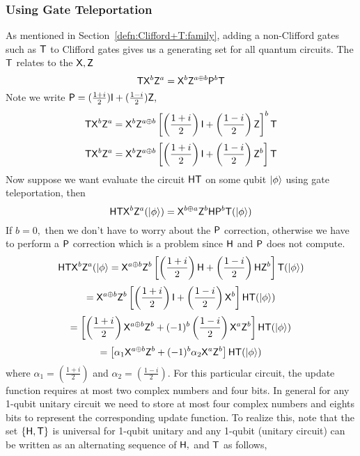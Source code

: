 \subsubsection{Using Gate Teleportation}
As mentioned in  Section~\ref{defn:Clifford+T:family}, adding a non-Clifford gates  such as ${\sf T}$ to Clifford gates gives us a generating set for all quantum circuits. The ${\sf T}$ relates to the ${\sf X}, {\sf Z}$
$${\sf T} {\sf X}^b {\sf Z}^a={\sf X}^b {\sf Z}^{a\oplus b}{\sf P}^b {\sf T}$$
Note we write ${\sf P}=(\frac{1+i}{2}) {\sf I} + (\frac{1-i}{2}){\sf Z},$
$${\sf T} {\sf X}^b {\sf Z}^a={\sf X}^b {\sf Z}^{a\oplus b}\left[\left(\frac{1+i}{2}\right) {\sf I} + \left(\frac{1-i}{2}\right){\sf Z}\right]^b {\sf T}$$
$${\sf T} {\sf X}^b {\sf Z}^a={\sf X}^b {\sf Z}^{a\oplus b}\left[\left(\frac{1+i}{2}\right) {\sf I} + \left(\frac{1-i}{2}\right){\sf Z}^b\right] {\sf T}$$
Now suppose we  want evaluate the circuit ${\sf H} {\sf T}$ on some qubit ${\lvert}\phi\rangle$ using gate teleportation, then
 $${\sf H} {\sf T} {\sf X}^b {\sf Z}^a ({\lvert}\phi\rangle) = {\sf X}^{b\oplus a} {\sf Z}^b {\sf H} {\sf P}^b {\sf T}({\lvert}\phi\rangle)$$
 If $b=0,$ then we don't have to worry about the ${\sf P}$ correction, otherwise we have to perform a ${\sf P}$ correction which is a problem since  ${\sf H}$ and ${\sf P}$ does not compute.
 $${\sf H} {\sf T} {\sf X}^b {\sf Z}^a ({\lvert}\phi\rangle={\sf X}^{a\oplus b} {\sf Z}^b  \left[\left(\frac{1+i}{2}\right) {\sf H} + \left(\frac{1-i}{2}\right){\sf H}{\sf Z}^b\right] {\sf T}({\lvert}\phi\rangle)$$
$$= {\sf X}^{a\oplus b} {\sf Z}^b  \left[\left(\frac{1+i}{2}\right) {\sf I} + \left(\frac{1-i}{2}\right){\sf X}^b\right] {\sf H}{\sf T}({\lvert}\phi\rangle)$$
$$=\left[\left(\frac{1+i}{2}\right){\sf X}^{a\oplus b} {\sf Z}^b  + (-1)^b\left(\frac{1-i}{2}\right)  {\sf X}^{a} {\sf Z}^b\right]{\sf H}{\sf T}({\lvert}\phi\rangle)$$
$$=\left[\alpha_1{\sf X}^{a\oplus b} {\sf Z}^b  + (-1)^b\alpha_2  {\sf X}^{a} {\sf Z}^b\right]{\sf H}{\sf T}({\lvert}\phi\rangle)$$
 where $\alpha_1=\left(\frac{1+i}{2}\right)$ and $\alpha_2=\left(\frac{1-i}{2}\right).$ For this particular circuit, the update function requires at most two complex numbers and four bits.
 In general for any 1-qubit  unitary circuit we need to store at most four complex numbers and eights bits to represent the corresponding update function. To realize this, note that the set $\{{\sf H},  {\sf T}\}$ is universal for 1-qubit unitary and any 1-qubit (unitary circuit) can be written as an alternating sequence of ${\sf H},$ and ${\sf T}$ as follows,

